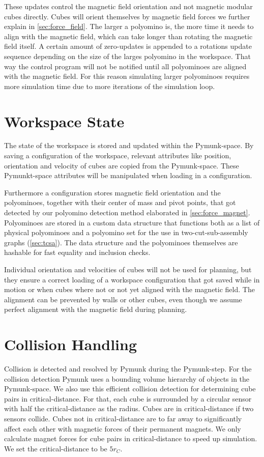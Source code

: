 These updates control the magnetic field orientation and not magnetic modular cubes directly.
Cubes will orient themselves by magnetic field forces we further explain in \autoref{sec:force_field}.
The larger a polyomino is, the more time it needs to align with the magnetic field, which can take longer than rotating the magnetic field itself.
A certain amount of zero-updates is appended to a rotations update sequence depending on the size of the larges polyomino in the workspace.
That way the control program will not be notified until all polyominoes are aligned with the magnetic field.
For this reason simulating larger polyominoes requires more simulation time due to more iterations of the simulation loop.

\section{Workspace State}
\label{sec:workspace_state}

The state of the workspace is stored and updated within the Pymunk-space.
By saving a configuration of the workspace, relevant attributes like position, orientation and velocity of cubes are copied from the Pymunk-space.
These Pymunkt-space attributes will be manipulated when loading in a configuration.

Furthermore a configuration stores magnetic field orientation and the polyominoes, together with their center of mass and pivot points, that got detected by our polyomino detection method elaborated in \autoref{sec:force_magnet}.
Polyominoes are stored in a custom data structure that functions both as a list of physical polyominoes and a polyomino set for the use in two-cut-sub-assembly graphs (\autoref{sec:tcsa}).
The data structure and the polyominoes themselves are hashable for fast equality and inclusion checks.

Individual orientation and velocities of cubes will not be used for planning, but they ensure a correct loading of a workspace configuration that got saved while in motion or when cubes where not or not yet aligned with the magnetic field.
The alignment can be prevented by walls or other cubes, even though we assume perfect alignment with the magnetic field during planning.

\section{Collision Handling}
\label{sec:coll_handling}

Collision is detected and resolved by Pymunk during the Pymunk-step.
For the collision detection Pymunk uses a bounding volume hierarchy of objects in the Pymunk-space.
We also use this efficient collision detection for determining cube pairs in critical-distance.
For that, each cube is surrounded by a circular sensor with half the critical-distance as the radius.
Cubes are in critical-distance if two sensors collide.
Cubes not in critical-distance are to far away to significantly affect each other with magnetic forces of their permanent magnets.
We only calculate magnet forces for cube pairs in critical-distance to speed up simulation.
We set the critical-distance to be $5 r_C$.

